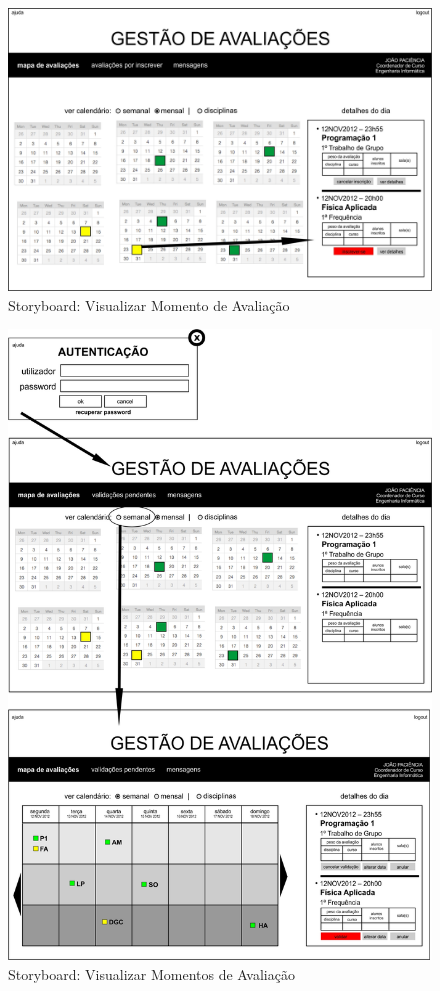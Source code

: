 \begin{figure}[!htbp]
\centering
\includegraphics{imagens/visualizar_momento_de_avaliacao_i.jpg}
\caption{Storyboard: Visualizar Momento de Avaliação}
\label{fig:visualizar_momento_de_avaliacao_i}
\end{figure}

\begin{figure}[!htbp]
\centering
\includegraphics{imagens/visualizar_momentos_de_avaliacao_i.jpg}
\caption{Storyboard: Visualizar Momentos de Avaliação}
\label{fig:visualizar_momentos_de_avaliacao_i}
\end{figure}